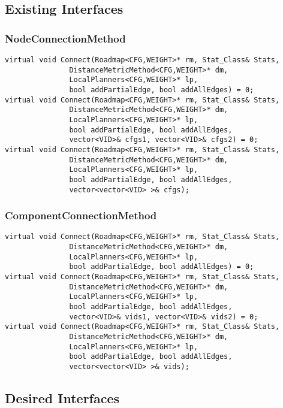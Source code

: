 

\subsection{Existing Interfaces}
\subsubsection{NodeConnectionMethod}
\begin{lstlisting}
virtual void Connect(Roadmap<CFG,WEIGHT>* rm, Stat_Class& Stats,
		       DistanceMetricMethod<CFG,WEIGHT>* dm,
		       LocalPlanners<CFG,WEIGHT>* lp,
		       bool addPartialEdge, bool addAllEdges) = 0;
virtual void Connect(Roadmap<CFG,WEIGHT>* rm, Stat_Class& Stats,
		       DistanceMetricMethod<CFG,WEIGHT>* dm,
		       LocalPlanners<CFG,WEIGHT>* lp,
		       bool addPartialEdge, bool addAllEdges,
		       vector<VID>& cfgs1, vector<VID>& cfgs2) = 0;
virtual void Connect(Roadmap<CFG,WEIGHT>* rm, Stat_Class& Stats,
		       DistanceMetricMethod<CFG,WEIGHT>* dm,
		       LocalPlanners<CFG,WEIGHT>* lp,
		       bool addPartialEdge, bool addAllEdges,
		       vector<vector<VID> >& cfgs);
\end{lstlisting}

\subsubsection{ComponentConnectionMethod}
\begin{lstlisting}
virtual void Connect(Roadmap<CFG,WEIGHT>* rm, Stat_Class& Stats,
		       DistanceMetricMethod<CFG,WEIGHT>* dm,
		       LocalPlanners<CFG,WEIGHT>* lp,
		       bool addPartialEdge, bool addAllEdges) = 0;
virtual void Connect(Roadmap<CFG,WEIGHT>* rm, Stat_Class& Stats,
		       DistanceMetricMethod<CFG,WEIGHT>* dm,
		       LocalPlanners<CFG,WEIGHT>* lp,
		       bool addPartialEdge, bool addAllEdges,
		       vector<VID>& vids1, vector<VID>& vids2) = 0;
virtual void Connect(Roadmap<CFG,WEIGHT>* rm, Stat_Class& Stats,
		       DistanceMetricMethod<CFG,WEIGHT>* dm,
		       LocalPlanners<CFG,WEIGHT>* lp,
		       bool addPartialEdge, bool addAllEdges,
		       vector<vector<VID> >& vids);
\end{lstlisting}  
\subsection{Desired Interfaces}
